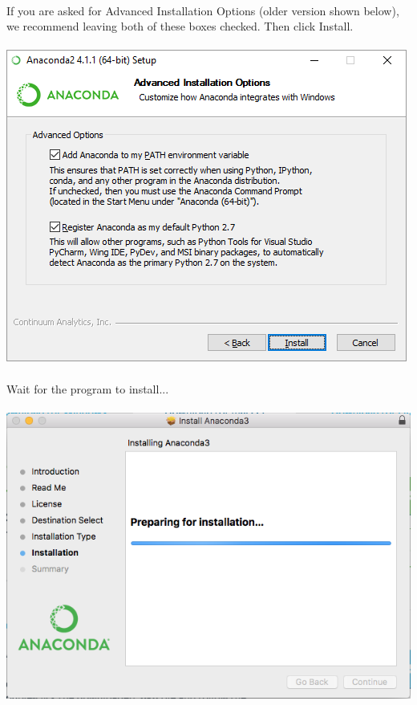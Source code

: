 \documentclass[]{article}
\begin{document}
\paragraph{}

\paragraph{}
If you are asked for Advanced Installation Options (older version shown below), we recommend leaving both of these boxes checked. Then click Install.
\paragraph{}
\begin{centering}
    \centerline{\includegraphics[scale=0.7]{Screenshot_9.png}}
\end{centering}

\paragraph{}
Wait for the program to install...
\paragraph{}
\begin{centering}
    \centerline{\includegraphics[scale=0.7]{Screenshot_10.png}}
\end{centering}
\end{document}
